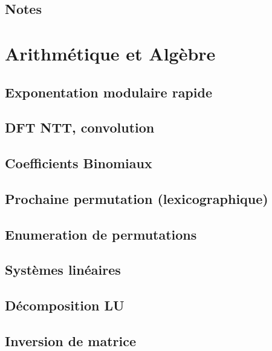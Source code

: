 \documentclass[10pt]{extarticle}
\begin{document}
\subsection{Notes}



\section{Arithmétique et Algèbre}
\subsection{Exponentation modulaire rapide}
{\scriptsize}

\subsection{DFT NTT, convolution}
{\scriptsize}

\subsection{Coefficients Binomiaux}
{\scriptsize}

\subsection{Prochaine permutation (lexicographique)}
{\scriptsize}

\subsection{Enumeration de permutations}
{\scriptsize}

\subsection{Systèmes linéaires}
{\scriptsize}

\subsection{Décomposition LU}
{\scriptsize}

\subsection{Inversion de matrice}
{\scriptsize}
\end{document}

